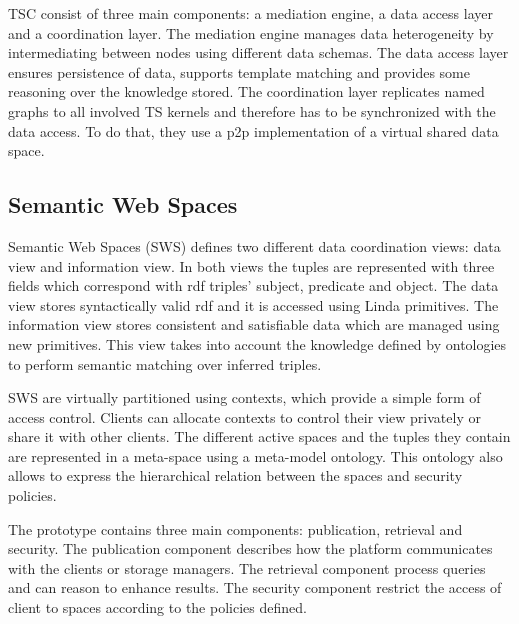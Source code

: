 TSC consist of three main components: a mediation engine, a data access layer and a coordination layer.
The mediation engine manages data heterogeneity by intermediating between nodes using different data schemas.
The data access layer ensures persistence of data, supports template matching and provides some reasoning over the knowledge stored.
The coordination layer replicates named graphs to all involved TS kernels and therefore has to be synchronized with the data access.
To do that, they use a \ac{p2p} implementation of a virtual shared data space. %



\subsection{Semantic Web Spaces}

Semantic Web Spaces (SWS) \citep{tolksdorf_coordination_2006} defines two different data coordination views: data view and information view.
In both views the tuples are represented with three fields which correspond with \ac{rdf} triples' subject, predicate and object.
The data view stores syntactically valid \ac{rdf} and it is accessed using Linda primitives.
The information view stores consistent and satisfiable data which are managed using new primitives.
This view takes into account the knowledge defined by ontologies to perform semantic matching over inferred triples.

SWS are virtually partitioned using contexts, which provide a simple form of access control.
Clients can allocate contexts to control their view privately or share it with other clients. %
The different active spaces and the tuples they contain are represented in a meta-space using a meta-model ontology.
This ontology also allows to express the hierarchical relation between the spaces and security policies.

The prototype contains three main components: publication, retrieval and security.
The publication component describes how the platform communicates with the clients or storage managers.
The retrieval component process queries and can reason to enhance results. %
The security component restrict the access of client to spaces according to the policies defined.  %



